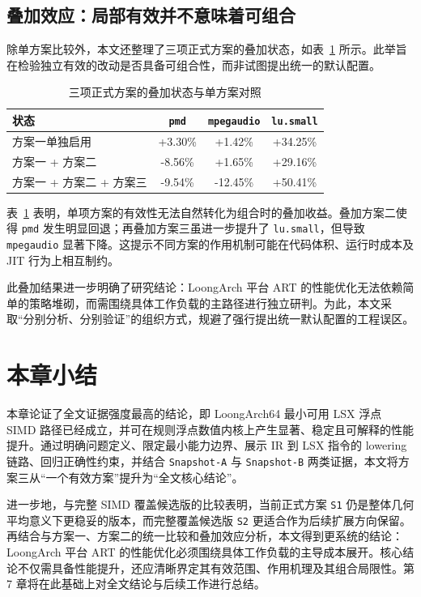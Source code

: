 \subsection{叠加效应：局部有效并不意味着可组合}

除单方案比较外，本文还整理了三项正式方案的叠加状态，如表~\ref{tab:stacking-conflict} 所示。此举旨在检验独立有效的改动是否具备可组合性，而非试图提出统一的默认配置。

\begin{table}[htbp]
    \centering
    \small
    \caption{三项正式方案的叠加状态与单方案对照}
    \label{tab:stacking-conflict}
    \begin{tabular}{lccc}
        \toprule
        \textbf{状态} & \textbf{\texttt{pmd}} & \textbf{\texttt{mpegaudio}} & \textbf{\texttt{lu.small}} \\
        \midrule
        方案一单独启用 & +3.30\% & +1.42\% & +34.25\% \\
        方案一 + 方案二 & -8.56\% & +1.65\% & +29.16\% \\
        方案一 + 方案二 + 方案三 & -9.54\% & -12.45\% & +50.41\% \\
        \bottomrule
    \end{tabular}
\end{table}

表~\ref{tab:stacking-conflict} 表明，单项方案的有效性无法自然转化为组合时的叠加收益。叠加方案二使得 \texttt{pmd} 发生明显回退；再叠加方案三虽进一步提升了 \texttt{lu.small}，但导致 \texttt{mpegaudio} 显著下降。这提示不同方案的作用机制可能在代码体积、运行时成本及 JIT 行为上相互制约。

此叠加结果进一步明确了研究结论：LoongArch 平台 ART 的性能优化无法依赖简单的策略堆砌，而需围绕具体工作负载的主路径进行独立研判。为此，本文采取“分别分析、分别验证”的组织方式，规避了强行提出统一默认配置的工程误区。

\section{本章小结}

本章论证了全文证据强度最高的结论，即 LoongArch64 最小可用 LSX 浮点 SIMD 路径已经成立，并可在规则浮点数值内核上产生显著、稳定且可解释的性能提升。通过明确问题定义、限定最小能力边界、展示 IR 到 LSX 指令的 lowering 链路、回归正确性约束，并结合 \texttt{Snapshot-A} 与 \texttt{Snapshot-B} 两类证据，本文将方案三从“一个有效方案”提升为“全文核心结论”。

进一步地，与完整 SIMD 覆盖候选版的比较表明，当前正式方案 \texttt{S1} 仍是整体几何平均意义下更稳妥的版本，而完整覆盖候选版 \texttt{S2} 更适合作为后续扩展方向保留。再结合与方案一、方案二的统一比较和叠加效应分析，本文得到更系统的结论：LoongArch 平台 ART 的性能优化必须围绕具体工作负载的主导成本展开。核心结论不仅需具备性能提升，还应清晰界定其有效范围、作用机理及其组合局限性。第 7 章将在此基础上对全文结论与后续工作进行总结。